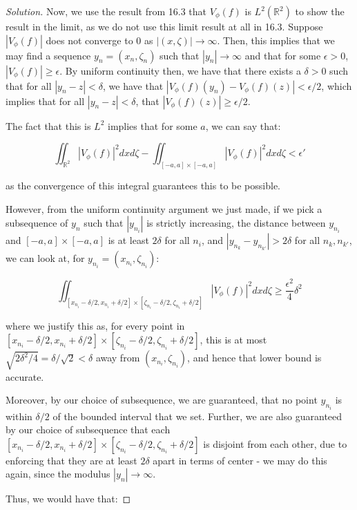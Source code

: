 \documentclass[10pt]{article}
\begin{document}
\begin{proof}[Solution]
Now, we use the result from 16.3 that $V_\phi(f)$ is $L^2(\mathbb{R}^2)$ to show the result in the limit, as we do not use this limit result at all in 16.3. Suppose $|V_\phi(f)|$ does not converge to $0$ as $|(x, \zeta)| \to \infty$. Then, this implies that we may find a sequence $y_n = (x_n, \zeta_n)$ such that $|y_n| \to \infty$ and that for some $\epsilon > 0$, $| V_\phi(f)| \geq \epsilon$. By uniform continuity then, we have that there exists a $\delta > 0$ such that for all $|y_n - z| < \delta$, we have that $|V_\phi(f)(y_n) - V_\phi(f)(z)| < \epsilon/2$, which implies that for all $|y_n - z| < \delta$, that $|V_\phi(f)(z)| \geq \epsilon/2$.

 The fact that this is $L^2$ implies that for some $a$, we can say that:

$$ \iint_{\mathbb{R}^2} | V_\phi(f)|^2 dx d\zeta - \iint_{[-a,a] \times [-a,a]} |V_\phi(f)|^2 dx d\zeta < \epsilon' $$

as the convergence of this integral guarantees this to be possible.

However, from the uniform continuity argument we just made, if we pick a subsequence of $y_n$ such that $|y_{n_i}|$ is strictly increasing, the distance between $y_{n_i}$ and $[-a, a] \times [-a, a]$ is at least $2 \delta$ for all $n_i$, and $|y_{n_k} - y_{n_{k'}}| > 2\delta$ for all $n_k, n_{k'}$, we can look at, for $y_{n_i} = (x_{n_i}, \zeta_{n_i})$:

$$ \iint_{[x_{n_i} - \delta/2, x_{n_i} + \delta/2] \times [\zeta_{n_i} - \delta/2, \zeta_{n_i} + \delta/2]} |V_{\phi}(f)|^2 dx d\zeta \geq \frac{\epsilon^2}{4}\delta^2 $$

where we justify this as, for every point in $[x_{n_i} - \delta/2, x_{n_i} + \delta/2] \times [\zeta_{n_i} - \delta/2, \zeta_{n_i} + \delta/2]$, this is at most $\sqrt{2\delta^2/4} = \delta/\sqrt{2} < \delta$ away from $(x_{n_i}, \zeta_{n_i})$, and hence that lower bound is accurate.

Moreover, by our choice of subsequence, we are guaranteed, that no point $y_{n_i}$ is within $\delta/2$ of the bounded interval that we set. Further, we are also guaranteed by our choice of subsequence that each $[x_{n_i} - \delta/2, x_{n_i} + \delta/2] \times [\zeta_{n_i} - \delta/2, \zeta_{n_i} + \delta/2]$ is disjoint from each other, due to enforcing that they are at least $2\delta$ apart in terms of center - we may do this again, since the modulus $|y_n | \to \infty$.

Thus, we would have that:


\end{proof}
\end{document}
